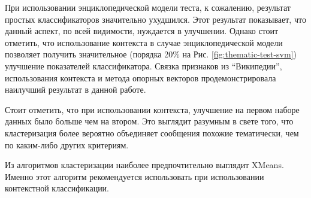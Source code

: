 При использовании энциклопедической модели теста, к сожалению, результат простых классификаторов значительно ухудшился. Этот результат показывает, что данный аспект, по всей видимости, нуждается в улучшении. Однако стоит отметить, что использование контекста в случае энциклопедической модели позволяет получить значительное (порядка 20\% на Рис. \ref{fig:thematic-test-svm}) улучшение показателей классификатора. Связка признаков из ``Википедии'', использования контекста и метода опорных векторов продемонстрировала наилучший результат в данной работе.

Стоит отметить, что при использовании контекста, улучшение на первом наборе данных было больше чем на втором. Это выглядит разумным в свете того, что кластеризация более вероятно объединяет сообщения похожие тематически, чем по каким-либо других критериям. 

Из алгоритмов кластеризации наиболее предпочтительно выглядит XMeans. Именно этот алгоритм рекомендуется использовать при использовании контекстной классификации.